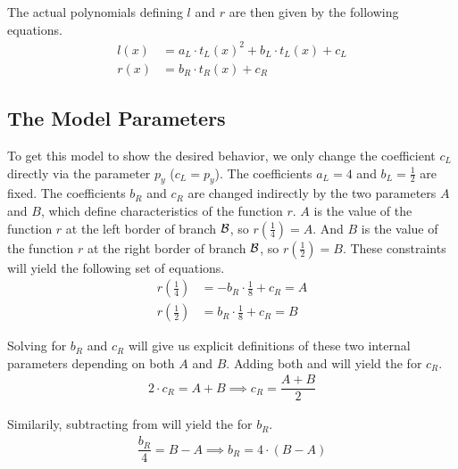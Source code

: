 The actual polynomials defining $l$ and $r$ are then given by the following equations.
\begin{align}
    l(x) & = a_L \cdot t_L(x)^2 + b_L \cdot t_L(x) + c_L \\
    r(x) & = b_R \cdot t_R(x) + c_R
    \label{equ:final.def.r}
\end{align}

\subsection{The Model Parameters}

To get this model to show the desired behavior, we only change the coefficient $c_L$ directly via the parameter $p_y$ ($c_L = p_y$).
The coefficients $a_L = 4$ and $b_L = \frac{1}{2}$ are fixed.
The coefficients $b_R$ and $c_R$ are changed indirectly by the two parameters $A$ and $B$, which define characteristics of the function $r$.
$A$ is the value of the function $r$ at the left border of branch $\mathcal{B}$, so $r(\frac{1}{4}) = A$.
And $B$ is the value of the function $r$ at the right border of branch $\mathcal{B}$, so $r(\frac{1}{2}) = B$.
These constraints will yield the following set of equations.
\begin{subequations}
    \begin{align}
        r\left(\frac{1}{4}\right) & = - b_R \cdot \frac{1}{8} + c_R = A
        \label{equ:final.def.param.constr.A}
        \\
        r\left(\frac{1}{2}\right) & = b_R \cdot \frac{1}{8} + c_R = B
        \label{equ:final.def.param.constr.B}
    \end{align}
\end{subequations}

Solving for $b_R$ and $c_R$ will give us explicit definitions of these two internal parameters depending on both $A$ and $B$.
Adding both  and  will yield the  for $c_R$.
\begin{align}
    2 \cdot c_R = A + B \implies c_R = \dfrac{A + B}{2}
    \label{equ:final.def.param.cR}
\end{align}

Similarily, subtracting  from  will yield the  for $b_R$.
\begin{align}
    \dfrac{b_R}{4} = B - A \implies b_R = 4 \cdot (B - A)
    \label{equ:final.def.param.bR}
\end{align}

